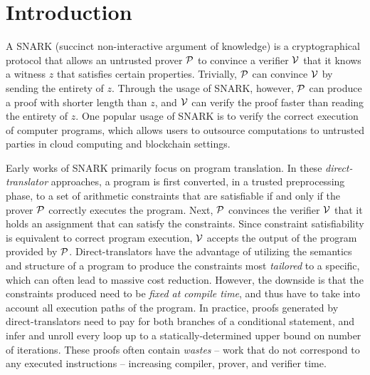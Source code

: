 \section{Introduction}

A SNARK (succinct non-interactive argument of knowledge) is a cryptographical protocol that allows an untrusted prover $\P$ to convince a verifier $\V$ that it knows a witness $z$ that satisfies certain properties. Trivially, $\P$ can convince $\V$ by sending the entirety of $z$. Through the usage of SNARK, however, $\P$ can produce a proof with shorter length than $z$, and $\V$ can verify the proof faster than reading the entirety of $z$. One popular usage of SNARK is to verify the correct execution of computer programs, which allows users to outsource computations to untrusted parties in cloud computing and blockchain settings.

Early works \cite{setty12ginger, wahby14buffet, kosba18xjsnark, ozdemir20circ} of SNARK primarily focus on program translation. In these \emph{direct-translator} approaches, a program is first converted, in a trusted preprocessing phase, to a set of arithmetic constraints that are satisfiable if and only if the prover $\P$ correctly executes the program.  Next, $\P$ convinces the verifier $\V$ that it holds an assignment that can satisfy the constraints. Since constraint satisfiability is equivalent to correct program execution, $\V$ accepts the output of the program provided by $\P$. Direct-translators have the advantage of utilizing the semantics and structure of a program to produce the constraints most \emph{tailored} to a specific, which can often lead to massive cost reduction. However, the downside is that the constraints produced need to be \emph{fixed at compile time}, and thus have to take into account all execution paths of the program. In practice, proofs generated by direct-translators need to pay for both branches of a conditional statement, and infer and unroll every loop up to a statically-determined upper bound on number of iterations. These proofs often contain \emph{wastes} -- work that do not correspond to any executed instructions --  increasing compiler, prover, and verifier time.

